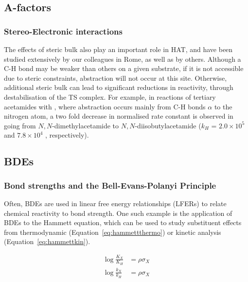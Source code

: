 \subsection{A-factors}


\subsubsection{Stereo-Electronic interactions}

The effects of steric bulk also play an important role in HAT, and have been studied extensively by our colleagues in Rome, as well as by others.\cite{Finn2004,Salamone2011,Pischel2001,Griller1981,Bietti2011, Salamone2012,Malatesta1982,Salamone2014} Although a C-H bond may be weaker than others on a given substrate, if it is not accessible due to steric constraints, abstraction will not occur at this site. Otherwise, additional steric bulk can lead to significant reductions in reactivity, through destabilisation of the TS complex. For example, in reactions of tertiary acetamides with \cumo,\cite{Salamone2014} where abstraction occurs mainly from C-H bonds $\alpha$ to the nitrogen atom, a two fold decrease in normalised rate constant is observed in going from $N,N$-dimethylacetamide to $N,N$-diisobutylacetamide ($k_H$ = $2.0 \times 10^5$ and $7.8 \times 10^4$ \Ms, respectively).

\subsection{BDEs}

\subsubsection{Bond strengths and the Bell-Evans-Polanyi Principle}

Often, BDEs are used in linear free energy relationships (LFERs) to relate chemical reactivity to bond strength. One such example\cite{Pratt2004} is the application of BDEs to the Hammett equation\cite{Anslyn2006}, which can be used to study substituent effects from thermodynamic (Equation~\ref{eq:hammettthermo}) or kinetic analysis (Equation~\ref{eq:hammettkin}).

\begin{align}
 \log\frac{K_X}{K_H} &= \rho \sigma_X \label{eq:hammettthermo} \\
 \log\frac{k_X}{k_H} &= \rho \sigma_X \label{eq:hammettkin}
\end{align}

